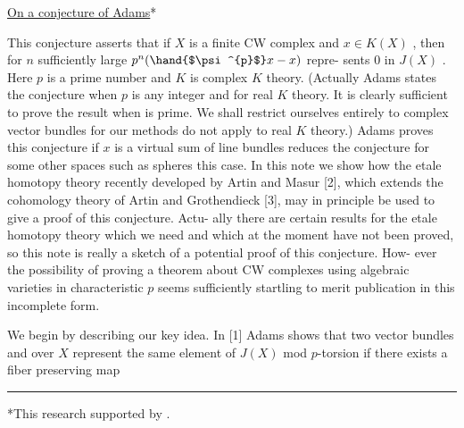 \begin{center}
\uline{On a conjecture of Adams}*

\end{center}

This conjecture asserts that if $X$ is a finite CW complex
and $x \in K(X)$ , then for $n$ sufficiently large $p^{n}(\hand{$\psi^{p}$}x - x)$ repre-%
sents $0$ in $J(X)$ . Here $p$ is a prime number and $K$ is complex
$K$ theory. (Actually Adams states the conjecture when $p$ is any
integer and for real $K$ theory. It is clearly sufficient to prove
the result when  is prime. We shall restrict ourselves entirely
to complex vector bundles for our methods do not apply to real $K$
theory.) Adams \hand{[1]} proves this conjecture if $x$ is a virtual sum
of line bundles  reduces the conjecture for some other spaces
such as spheres  this case. In this note we show how the etale
homotopy theory recently developed by Artin and Masur [2], which
extends the  cohomology theory of Artin and Grothendieck [3],
may in principle be used to give a proof of this conjecture. Actu-%
ally there are certain results for the etale homotopy theory which
we need and which at the moment have not been proved, so this note
is really a sketch of a potential proof of this conjecture. How-%
ever the possibility of proving a theorem about CW complexes
using algebraic varieties in characteristic $p$ seems sufficiently
startling to merit publication in this incomplete form.

We begin by describing our key idea. In [1] Adams shows that
two vector bundles  and  over $X$ represent the same element
of $J(X)$ mod $p$-torsion if there exists a fiber preserving map

\noindent\rule{0.4\textwidth}{0.4pt} 

*This research  supported  by 
.

